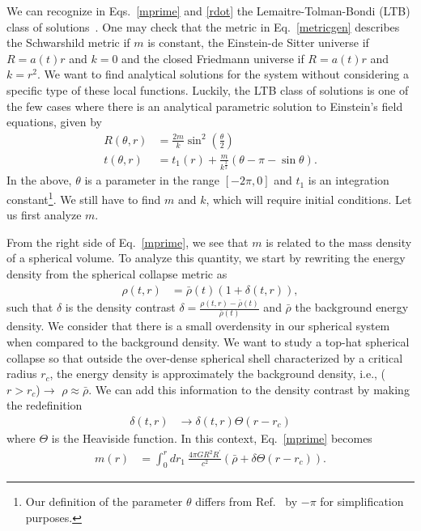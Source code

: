 \documentclass[a4paper,11pt]{article}
\begin{document}
We can recognize in Eqs.~\eqref{mprime} and \eqref{rdot} the Lemaitre-Tolman-Bondi (LTB) class of solutions~\cite{Lemaitre1933}. One may check that the metric in Eq.~\eqref{metricgen} describes the Schwarshild metric if $m$ is constant, the Einstein-de Sitter universe if $R = a(t)r$ and $k=0$ and the closed Friedmann universe if $R= a(t)r$ and $k = r^2$. We want to find analytical solutions for the system without considering a specific type of these local functions. Luckily, the LTB class of solutions is one of the few cases where there is an analytical parametric solution to Einstein's field equations, given by
\begin{align}
	\label{ltb1}
	R(\theta, r) & = \frac{2m}{k}\sin^2\left(\frac{\theta}{2}\right)                          \\
	\label{ltb2}
	t(\theta, r) & = t_1(r) + \frac{m}{k^{\frac{3}{2}}}\left(\theta - \pi - \sin\theta\right)
	.\end{align}
In the above, $\theta$ is a parameter in the range $[-2\pi, 0]$ and $t_1$ is an integration constant\footnote{Our definition of the parameter $\theta$ differs from Ref.~\cite{Martin2020} by $-\pi$ for simplification purposes.}. We still have to find $m$ and $k$, which will require initial conditions. Let us first analyze $m$.

From the right side of Eq.~\eqref{mprime}, we see that $m$ is related to the mass density of a spherical volume. To analyze this quantity, we start by rewriting the energy density from the spherical collapse metric as
\begin{align}
	\rho(t, r) & = \bar{\rho}(t)(1 + \delta(t,r))
	,\end{align}
such that $\delta$ is the density contrast $\delta = \frac{\rho(t,r) - \bar{\rho}(t)}{\bar{\rho}(t)}$ and $\bar{\rho}$ the background energy density.  We consider that there is a small overdensity in our spherical system when compared to the background density. We want to study a top-hat spherical collapse so that outside the over-dense spherical shell characterized by a critical radius $r_c$, the energy density is approximately the background density, i.e., ($r > r_c$)$\rightarrow$ $\rho \approx \bar{\rho}$. We can add this information to the density contrast by making the redefinition
\begin{align}
	\delta(t, r) & \rightarrow \delta(t, r) \Theta(r-r_c)
\end{align}
where $\Theta$ is the Heaviside function. In this context, Eq.~\eqref{mprime} becomes
\begin{align}
	m(r) & = \int_0^r dr_1~ \frac{4\pi GR^2R^\prime}{c^2} \left(\bar{\rho} + \delta \Theta(r-r_c)\right)
	.\end{align}
\end{document}
